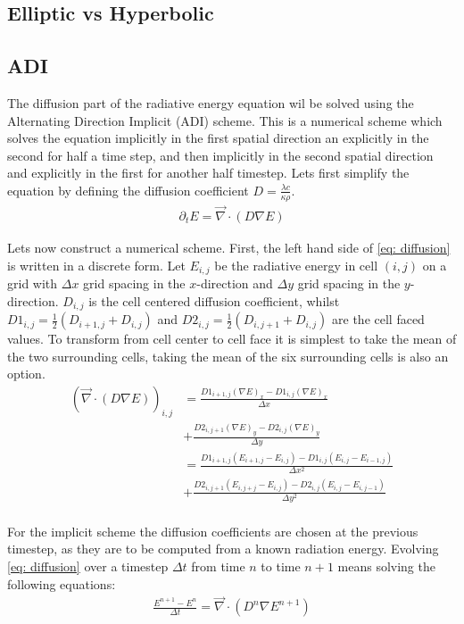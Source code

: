 \subsection{Elliptic vs Hyperbolic}
\subsection{ADI}
The diffusion part of the radiative energy equation wil be solved using the Alternating Direction Implicit (ADI) scheme. This is a numerical scheme which solves the equation implicitly in the first spatial direction an explicitly in the second for half a time step, and then implicitly in the second spatial direction and explicitly in the first for another half timestep. Lets first simplify the equation by defining the diffusion coefficient $D = \frac{\lambda c}{\kappa \rho}$. 
\begin{align}
\partial_t E  = \vec{\nabla} \cdot \left(D \nabla E\right) \label{eq: diffusion}
\end{align}

Lets now construct a numerical scheme. First, the left hand side of \eqref{eq: diffusion} is written in a discrete form. Let $E_{i,j}$ be the radiative energy in cell $(i,j)$ on a grid with $\Delta x$ grid spacing in the $x$-direction and $\Delta y$ grid spacing in the $y$-direction. $D_{i,j}$ is the cell centered diffusion coefficient, whilst $D1_{i,j} = \frac{1}{2} (D_{i+1,j} + D_{i,j})$ and $D2_{i,j} = \frac{1}{2} (D_{i,j+1} + D_{i,j})$ are the cell faced values. To transform from cell center to cell face it is simplest to take the mean of the two surrounding cells, taking the mean of the six surrounding cells is also an option. 
\begin{align}
\left( \vec{\nabla} \cdot \left(D \nabla E\right) \right)_{i,j} 
 &= \frac{D1_{i+1,j} (\nabla E)_{x} - D1_{i,j} (\nabla E)_{x}}{\Delta x} \\
 &+ \frac{D2_{i,j+1} (\nabla E)_{y} - D2_{i,j} (\nabla E)_{y}}{\Delta y} \\ 
 &= \frac{D1_{i+1,j} (E_{i+1,j} - E_{i,j}) - D1_{i,j} (E_{i,j} - E_{i-1,j})}{\Delta x^2} \\
 &+ \frac{D2_{i,j+1} (E_{i,j+j} - E_{i,j}) - D2_{i,j} (E_{i,j} - E_{i,j-1})}{\Delta y^2} \\ 
\end{align}

For the implicit scheme the diffusion coefficients are chosen at the previous timestep, as they are to be computed from a known radiation energy. Evolving \eqref{eq: diffusion} over a timestep $\Delta t$ from time $n$ to time $n+1$ means solving the following equations:
\begin{align}
\frac{E^{n+1} - E^{n}}{\Delta t} = \vec{\nabla} \cdot \left(D^n \nabla E^{n+1}\right) \label{eq: Error_control}
\end{align}

